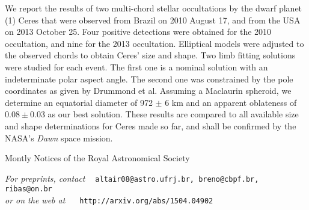 {We report the results of two multi-chord stellar occultations by the dwarf planet (1) Ceres that were observed  from Brazil on 2010 August 17, and from the USA on 2013 October 25. Four positive detections were obtained for the 2010 occultation, and nine for the 2013 occultation. Elliptical models were adjusted to the observed chords to obtain Ceres' size and shape. Two limb fitting solutions were studied for each event. The first one is a nominal solution with an indeterminate polar aspect angle. The second one was constrained by the pole coordinates as given by Drummond et al. Assuming a Maclaurin spheroid, we determine an equatorial diameter of 972 $\pm$ 6 km and an apparent oblateness of $0.08 \pm 0.03$ as our best solution. These results are compared to all available size and shape determinations for Ceres made so far, and shall be confirmed by the NASA's \textit{Dawn} space mission.


}{

Montly Notices of the Royal Astronomical Society


}

{\it For preprints, contact \ }  {\tt altair08@astro.ufrj.br, breno@cbpf.br, ribas@on.br} \\
{\it or on the web at \ }       {\verb| http://arxiv.org/abs/1504.04902 |}


